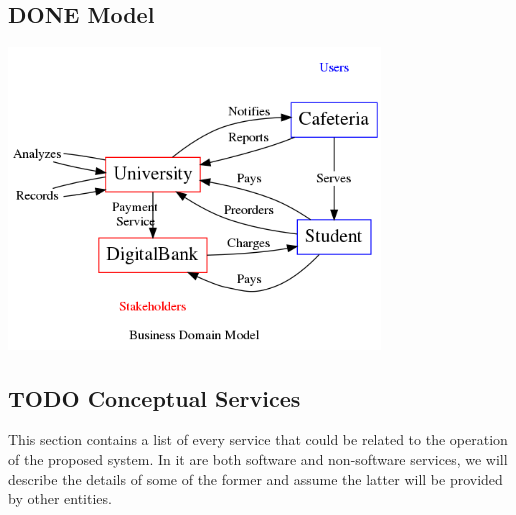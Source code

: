 \documentclass[11pt]{article}
\begin{document}
\subsection{{\bfseries\sffamily DONE} Model}
\label{sec:org4de8a18}
\begin{center}
\includegraphics[height=8cm]{res/business_domain.png}
\end{center}

\subsection{{\bfseries\sffamily TODO} Conceptual Services}
\label{sec:org85e4dc4}
This section contains a list of every service that could be related
to the operation of the proposed system. In it are both software
and non-software services, we will describe the details of some of
the former and assume the latter will be provided by other
entities.
\end{document}
